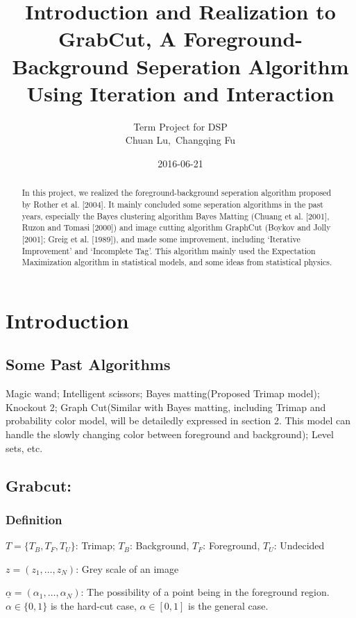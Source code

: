 \documentclass[a4paper, 11pt, nofonts, nocap, fancyhdr, hyperref, UTF8]{ctexart}
\begin{document}
\title{Introduction and Realization to GrabCut, A Foreground-Background Seperation Algorithm Using Iteration and Interaction}

\author{{Term Project for DSP}\\
Chuan Lu,\ Changqing Fu\\
}
\date{2016-06-21}
\maketitle

\begin{abstract}%
In this project, we realized the foreground-background seperation algorithm proposed by Rother et al. [2004]. It mainly concluded some seperation algorithms in the past years, especially the Bayes clustering algorithm Bayes Matting (Chuang et al. [2001], Ruzon and Tomasi [2000]) and image cutting algorithm GraphCut (Boykov and Jolly [2001]; Greig et al. [1989]), and made some improvement, including `Iterative Improvement' and `Incomplete Tag'. This algorithm mainly used the Expectation Maximization algorithm in statistical models, and some ideas from statistical physics.
\end{abstract}

\section{Introduction}
\subsection{Some Past Algorithms}
Magic wand; Intelligent scissors; Bayes matting(Proposed Trimap model); Knockout 2; Graph Cut(Similar with Bayes matting, including Trimap and probability color model, will be detailedly expressed in section 2. This model can handle the slowly changing color between foreground and background); Level sets, etc.

\subsection{Grabcut:}
\subsubsection{Definition}
$T = \{T_B, T_F, T_U\}$: Trimap; $T_B$: Background, $T_F$: Foreground, $T_U$: Undecided 

$z = (z_1,\ldots,z_N)$: Grey scale of an image

$\underline{\alpha} = (\alpha_1,\ldots,\alpha_N)$: The possibility of a point being in the foreground region. $\alpha \in \{0,1\}$ is the hard-cut case, $\alpha \in [0,1]$ is the general case.
\end{document}
